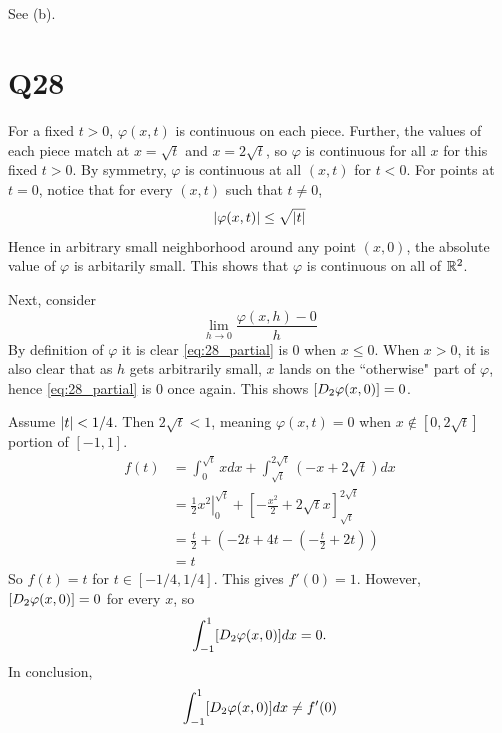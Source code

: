 \documentclass[12pt]{article}
\begin{document}
\subsection{} 
See (b). 

\section*{Q28}
For a fixed $t > 0$, $\varphi(x, t)$ is continuous on each piece. 
Further, the values of each piece match at $x = \sqrt{t}$ and $x = 2\sqrt{t}$, so $\varphi$ is continuous for all $x$ for this fixed $t > 0$. 
By symmetry, $\varphi$ is continuous at all $(x, t)$ for $t < 0$. 
For points at $t = 0$, notice that for every $(x, t)$ such that $t \neq 0$, 
$$\left|\varphi(x, t)\right| \leq \sqrt{\left|t\right|}$$
Hence in arbitrary small neighborhood around any point $(x, 0)$, the absolute value of $\varphi$ is arbitarily small. 
This shows that $\varphi$ is continuous on all of $\mathbb{R}^2$. 

Next, consider 
\begin{equation} \label{eq:28_partial}
  \lim_{h \rightarrow 0} \frac{\varphi(x, h) - 0}{h}
\end{equation}
By definition of $\varphi$ it is clear \eqref{eq:28_partial} is 0 when $x \leq 0$. 
When $x > 0$, it is also clear that as $h$ gets arbitrarily small, $x$ lands on the ``otherwise" part of $\varphi$, hence \eqref{eq:28_partial} is 0 once again. 
This shows $[D_{2}\varphi(x, 0)] = 0$. 

Assume $\left|t\right| < 1/4$. 
Then $2\sqrt{t} < 1$, meaning $\varphi(x, t) = 0$ when $x \notin [0, 2\sqrt{t}]$ portion of $[-1, 1]$. 
\begin{align*}
  f(t) & = \int_{0}^{\sqrt{t}}xdx + \int_{\sqrt{t}}^{2\sqrt{t}} (-x + 2\sqrt{t})dx \\ 
       & = \frac{1}{2}\left.x^2\right|_{0}^{\sqrt{t}} + \left[-\frac{x^2}{2} + 2\sqrt{t}x\right]_{\sqrt{t}}^{2\sqrt{t}} \\ 
       & = \frac{t}{2} + (-2t + 4t - (-\frac{t}{2} + 2t)) \\ 
       & = t
\end{align*}
So $f(t) = t$ for $t \in [-1/4, 1/4]$. 
This gives $f'(0) = 1$. 
However, $[D_{2}\varphi(x, 0)] = 0$ for every $x$, so 
$$\int_{-1}^{1} [D_{2}\varphi(x, 0)] dx = 0.$$
In conclusion, 
$$\int_{-1}^{1} [D_{2}\varphi(x, 0)]dx \neq f'(0)$$
\end{document}
